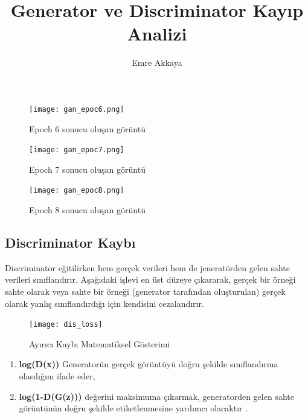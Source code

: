 \documentclass[10pt]{article}
\begin{document}
	\begin{figure}[htbp]
		\centering
		\texttt{[image: gan\_epoc6.png]}
		\caption{Epoch 6 sonucu oluşan görüntü}
		\label{fig:uretici_tuketici}
	\end{figure}
	
	\begin{figure}[htbp]
		\centering
		\texttt{[image: gan\_epoc7.png]}
		\caption{Epoch 7 sonucu oluşan görüntü}
		\label{fig:uretici_tuketici}
		
	\end{figure}
	
	\begin{figure}[htbp]
		\centering
		\texttt{[image: gan\_epoc8.png]}
		\caption{Epoch 8 sonucu oluşan görüntü}
		\label{fig:uretici_tuketici}
		
		
	\end{figure}
	
	\title{Generator ve Discriminator Kayıp Analizi}
	\author{Emre Akkaya}
	
	
	
	
	
	\maketitle
	
	\subsection{Discriminator Kaybı}
	Discriminator eğitilirken hem gerçek verileri hem de jeneratörden gelen sahte verileri sınıflandırır. Aşağıdaki işlevi en üst düzeye çıkararak, gerçek bir örneği sahte olarak veya sahte bir örneği (generator tarafından oluşturulan) gerçek olarak yanlış sınıflandırdığı için kendisini cezalandırır.
	
	\begin{figure}[htbp]
		\centering
		\texttt{[image: dis\_loss]}
		\caption{Ayırıcı Kaybı Matematiksel Gösterimi}
		\label{fig:dis_loss}
	\end{figure}
	
	\begin{enumerate}
		\item \textbf{log(D(x))} Generatorün gerçek görüntüyü doğru şekilde sınıflandırma olasılığını ifade eder,
		\item \textbf{log(1-D(G(z)))} değerini maksimuma çıkarmak, generatorden gelen sahte görüntünün doğru şekilde etiketlenmesine yardımcı olacaktır \cite{loss_neptune}.
	\end{enumerate}
	
\end{document}
